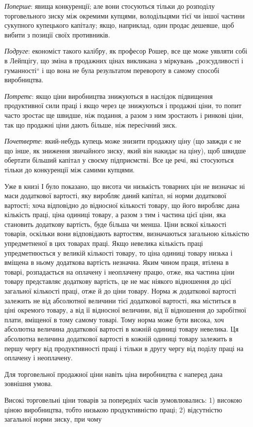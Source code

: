 \parcont{}  %
\emph{Поперше}: явища конкуренції; але вони стосуються тільки до
розподілу торговельного зиску між окремими купцями, володільцями
тієї чи іншої частини сукупного купецького капіталу; якщо,
наприклад, один продає дешевше, щоб вибити з позиції своїх
противників.

\emph{Подруге}: економіст такого калібру, як професор Рошер, все
ще може уявляти собі в Лейпцігу, що зміна в продажних цінах
викликана з міркувань „розсудливості і гуманності“ і що вона
не була результатом перевороту в самому способі виробництва.

\emph{Потретє}: якщо ціни виробництва знижуються в наслідок
підвищення продуктивної сили праці і якщо через це знижуються
і продажні ціни, то попит часто зростає ще швидше, ніж
подання, а разом з ним зростають і ринкові ціни, так що продажні
ціни дають більше, ніж пересічний зиск.

\emph{Почетверте}: який-небудь купець може знизити продажну
ціну (що завжди є не що інше, як зниження звичайного зиску,
який він накидає на ціну), щоб швидше обертати більший
капітал у своєму підприємстві. Все це речі, які стосуються
тільки до конкуренції між самими купцями.

Уже в книзі І було показано, що висота чи низькість товарних
цін не визначає ні маси додаткової вартості, яку
виробляє даний капітал, ні норми додаткової вартості; хоча
відповідно до відносної кількості товару, що його виробляє
дана кількість праці, ціна одиниці товару, а разом з тим
і частина цієї ціни, яка становить додаткову вартість, буде більша
чи менша. Ціни всякої кількості товарів, оскільки вони відповідають
вартостям, визначаються загальною кількістю упредметненої
в цих товарах праці. Якщо невелика кількість праці
упредметнюється у великій кількості товару, то ціна одиниці
товару низька і вміщена в ньому додаткова вартість незначна.
Яким чином праця, втілена в товарі, розпадається на оплачену
і неоплачену працю, отже, яка частина ціни товару представляє
додаткову вартість, це не має ніякого відношення до цієї загальної
кількості праці, отже й до ціни товару. Норма ж додаткової
вартості залежить не від абсолютної величини тієї
додаткової вартості, яка міститься в ціні окремого товару,
а від її відносної величини, від її відношення до заробітної плати,
вміщеної в тому самому товарі. Тому норма може бути висока,
хоч абсолютна величина додаткової вартості в кожній одиниці
товару невелика. Ця абсолютна величина додаткової вартості
в кожній одиниці товару залежить в першу чергу від продуктивності
праці і тільки в другу чергу від поділу праці на оплачену
і неоплачену.

Для торговельної продажної ціни навіть ціна виробництва є
наперед дана зовнішня умова.

Високі торговельні ціни товарів за попередніх часів зумовлювались:
1) високою ціною виробництва, тобто низькою продуктивністю
праці; 2) відсутністю загальної норми зиску, при чому
\parbreak{}  %
